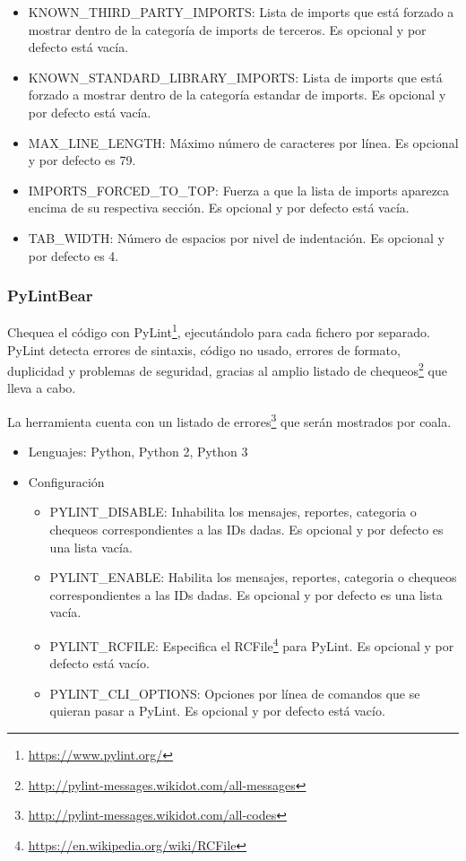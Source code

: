 \documentclass[a4paper, 12pt]{book}
\begin{document}
\begin{itemize}
\begin{itemize}
          \item KNOWN\_THIRD\_PARTY\_IMPORTS: Lista de imports que está forzado a mostrar dentro de la categoría de imports de terceros. Es opcional y por defecto está vacía.
          \item KNOWN\_STANDARD\_LIBRARY\_IMPORTS: Lista de imports que está forzado a mostrar dentro de la categoría estandar de imports. Es opcional y por defecto está vacía.
          \item MAX\_LINE\_LENGTH: Máximo número de caracteres por línea. Es opcional y por defecto es 79.
          \item IMPORTS\_FORCED\_TO\_TOP: Fuerza a que la lista de imports aparezca encima de su respectiva sección. Es opcional y por defecto está vacía.
          \item TAB\_WIDTH: Número de espacios por nivel de indentación. Es opcional y por defecto es 4.
    \end{itemize}
\end{itemize}

\subsubsection{PyLintBear}
\label{sec:seccion1.2.10}
Chequea el código con PyLint\footnote{\url{https://www.pylint.org/}}, ejecutándolo para cada fichero por separado. PyLint detecta errores de sintaxis, código no usado, errores de formato, duplicidad y problemas de seguridad, gracias al amplio listado de chequeos\footnote{\url{http://pylint-messages.wikidot.com/all-messages}} que lleva a cabo.

La herramienta cuenta con un listado de errores\footnote{\url{http://pylint-messages.wikidot.com/all-codes}} que serán mostrados por coala.

\begin{itemize}
  \item Lenguajes: Python, Python 2, Python 3
  \item Configuración
    \begin{itemize}
          \item PYLINT\_DISABLE: Inhabilita los mensajes, reportes, categoria o chequeos correspondientes a las IDs dadas. Es opcional y por defecto es una lista vacía.
          \item PYLINT\_ENABLE: Habilita los mensajes, reportes, categoria o chequeos correspondientes a las IDs dadas. Es opcional y por defecto es una lista vacía.
          \item PYLINT\_RCFILE: Especifica el RCFile\footnote{\url{https://en.wikipedia.org/wiki/RCFile}} para PyLint. Es opcional y por defecto está vacío.
          \item PYLINT\_CLI\_OPTIONS: Opciones por línea de comandos que se quieran pasar a PyLint. Es opcional y por defecto está vacío.
    \end{itemize}
\end{itemize}
\end{document}
